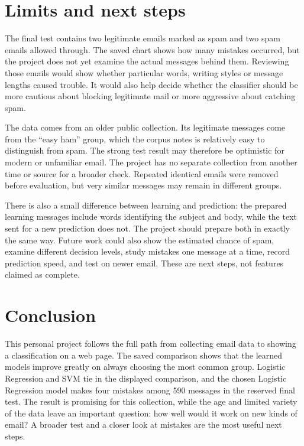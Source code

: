 \chapter{Limits and next steps}
The final test contains two legitimate emails marked as spam and two spam emails allowed through. The saved chart shows how many mistakes occurred, but the project does not yet examine the actual messages behind them. Reviewing those emails would show whether particular words, writing styles or message lengths caused trouble. It would also help decide whether the classifier should be more cautious about blocking legitimate mail or more aggressive about catching spam.

The data comes from an older public collection. Its legitimate messages come from the ``easy ham'' group, which the corpus notes is relatively easy to distinguish from spam\cite{corpus}. The strong test result may therefore be optimistic for modern or unfamiliar email. The project has no separate collection from another time or source for a broader check. Repeated identical emails were removed before evaluation, but very similar messages may remain in different groups.

There is also a small difference between learning and prediction: the prepared learning messages include words identifying the subject and body, while the text sent for a new prediction does not. The project should prepare both in exactly the same way. Future work could also show the estimated chance of spam, examine different decision levels, study mistakes one message at a time, record prediction speed, and test on newer email. These are next steps, not features claimed as complete.

\chapter{Conclusion}
This personal project follows the full path from collecting email data to showing a classification on a web page. The saved comparison shows that the learned models improve greatly on always choosing the most common group. Logistic Regression and SVM tie in the displayed comparison, and the chosen Logistic Regression model makes four mistakes among 590 messages in the reserved final test. The result is promising for this collection, while the age and limited variety of the data leave an important question: how well would it work on new kinds of email? A broader test and a closer look at mistakes are the most useful next steps.
